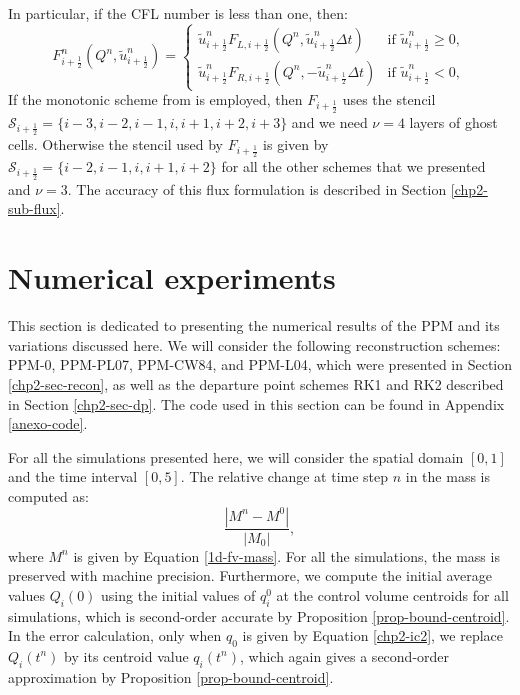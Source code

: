 In particular, if the CFL number is less than one, then:
\begin{equation}
	\label{chp-sec-flux:numerical-flux3}
    F_{i+\frac{1}{2}}^n(Q^n,\tilde{u}_{i+\frac{1}{2}}^n)  =  
    	\begin{cases}
		\tilde{u}_{i+\frac{1}{2}}^nF_{L,i+\frac{1}{2}}(Q^n, \tilde{u}_{i+\frac{1}{2}}^n\Delta t) & \text{if } \tilde{u}_{i+\frac{1}{2}}^n \geq 0,\\
	    \tilde{u}_{i+\frac{1}{2}}^nF_{R,i+\frac{1}{2}}(Q^n,-\tilde{u}_{i+\frac{1}{2}}^n\Delta t) & \text{if } \tilde{u}_{i+\frac{1}{2}}^n<0,
    	\end{cases}
\end{equation}
If the monotonic scheme from \citet{lin:2004} is employed, then $F_{i+\frac{1}{2}}$ uses the stencil
$\mathcal{S}_{i+\frac{1}{2}} = \{i-3,i-2,i-1,i,i+1,i+2,i+3\}$ and we need $\nu=4$ layers of ghost cells.
Otherwise the stencil used by $F_{i+\frac{1}{2}}$ is given by 
$\mathcal{S}_{i+\frac{1}{2}} = \{i-2,i-1,i,i+1,i+2\}$ for all the other schemes that we presented and $\nu=3$.
The accuracy of this flux formulation is described in Section \ref{chp2-sub-flux}.

\section{Numerical experiments}
\label{chp2-sec-numerical-exp}
This section is dedicated to presenting the numerical results of the PPM and 
its variations discussed here. We will consider the following reconstruction
schemes: PPM-0, PPM-PL07, PPM-CW84, and PPM-L04, which were presented in Section
\ref{chp2-sec-recon}, as well as the departure point schemes RK1 and RK2 described 
in Section \ref{chp2-sec-dp}. The code used in this section can be found in Appendix \ref{anexo-code}.

For all the simulations presented here, we will consider the spatial domain $[0,1]$ and the time interval $[0,5]$.
The relative change at time step $n$ in the mass is computed as:
\begin{equation*}
	\frac{|M^n-M^0|}{|M_0|},
\end{equation*}
where $M^n$ is given by Equation \eqref{1d-fv-mass}. For all the simulations, the
mass is preserved with machine precision. Furthermore,
we compute the initial average values $Q_i(0)$ using
the initial values of $q^0_i$ at the control volume centroids for all simulations,
which is second-order accurate by Proposition \ref{prop-bound-centroid}. 
In the error calculation, only when $q_0$ is given by Equation \eqref{chp2-ic2},
we replace $Q_{i}(t^n)$ by its centroid value $q_{i}(t^n)$, which again gives
a second-order approximation by Proposition \ref{prop-bound-centroid}.

